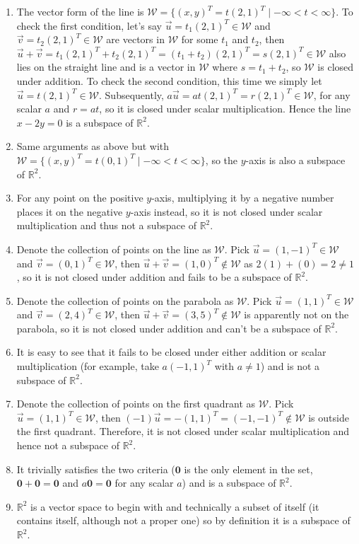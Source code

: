 \begin{solution}
\begin{enumerate}[label=(\alph*)]
\item The vector form of the line is $\mathcal{W} = \{(x,y)^T = t(2,1)^T \mid -\infty < t < \infty\}$. To check the first condition, let's say $\vec{u} = t_1(2,1)^T \in \mathcal{W}$ and $\vec{v} = t_2(2,1)^T \in \mathcal{W}$ are vectors in $\mathcal{W}$ for some $t_1$ and $t_2$, then $\vec{u} + \vec{v} = t_1(2,1)^T + t_2(2,1)^T = (t_1 + t_2)(2,1)^T = s(2,1)^T \in \mathcal{W}$ also lies on the straight line and is a vector in $\mathcal{W}$ where $s = t_1 + t_2$, so $\mathcal{W}$ is closed under addition. To check the second condition, this time we simply let $\vec{u} = t(2,1)^T \in \mathcal{W}$. Subsequently, $a\vec{u} = at(2,1)^T = r(2,1)^T \in \mathcal{W}$, for any scalar $a$ and $r = at$, so it is closed under scalar multiplication. Hence the line $x-2y = 0$ is a subspace of $\mathbb{R}^2$.
\item Same arguments as above but with $\mathcal{W} = \{(x,y)^T = t(0,1)^T \mid -\infty < t < \infty\}$, so the $y$-axis is also a subspace of $\mathbb{R}^2$.
\item For any point on the positive $y$-axis, multiplying it by a negative number places it on the negative $y$-axis instead, so it is not closed under scalar multiplication and thus not a subspace of $\mathbb{R}^2$. 
\item Denote the collection of points on the line as $\mathcal{W}$. Pick $\vec{u} = (1, -1)^T \in \mathcal{W}$ and $\vec{v} = (0, 1)^T \in \mathcal{W}$, then $\vec{u} + \vec{v} = (1, 0)^T \notin \mathcal{W}$ as $2(1) + (0) = 2 \neq 1$, so it is not closed under addition and fails to be a subspace of $\mathbb{R}^2$.
\item Denote the collection of points on the parabola as $\mathcal{W}$. Pick $\vec{u} = (1,1)^T \in \mathcal{W}$ and $\vec{v} = (2,4)^T \in \mathcal{W}$, then $\vec{u} + \vec{v} = (3,5)^T \notin \mathcal{W}$ is apparently not on the parabola, so it is not closed under addition and can't be a subspace of $\mathbb{R}^2$.
\item It is easy to see that it fails to be closed under either addition or scalar multiplication (for example, take $a(-1,1)^T$ with $a\neq 1$) and is not a subspace of $\mathbb{R}^2$.
\item Denote the collection of points on the first quadrant as $\mathcal{W}$. Pick $\vec{u} = (1,1)^T \in \mathcal{W}$, then $(-1)\vec{u} = -(1,1)^T = (-1,-1)^T \notin \mathcal{W}$ is outside the first quadrant. Therefore, it is not closed under scalar multiplication and hence not a subspace of $\mathbb{R}^2$.
\item It trivially satisfies the two criteria ($\textbf{0}$ is the only element in the set, $\textbf{0} + \textbf{0} = \textbf{0}$ and $a\textbf{0} = \textbf{0}$ for any scalar $a$) and is a subspace of $\mathbb{R}^2$.
\item $\mathbb{R}^2$ is a vector space to begin with and technically a subset of itself (it contains itself, although not a proper one) so by definition it is a subspace of $\mathbb{R}^2$.
\end{enumerate}
\end{solution}
